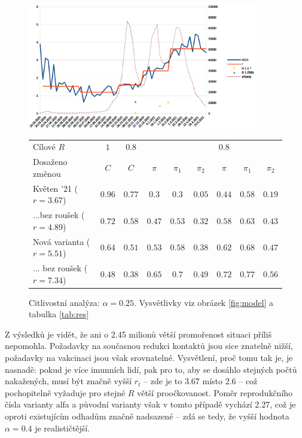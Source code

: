 \begin{figure}
\begin{center}
\includegraphics[width=10cm]{pic/whole4}
						 

\begin{tabular}{l|c|c|ccc|ccc}									
Cílové $R$	& $1$	& $0.8$	&	&	&	& $0.8$	&	&	\\ 
Dosaženo změnou	& $C$	& $C$	& $\pi$	& $\pi_1$	& $\pi_2$	& $\pi$	& $\pi_1$	& $\pi_2$	\\ \hline
Květen '21 ($r=3.67$)	& $0.96$	& $0.77$	& $0.3$	& $0.3$	& $0.05$	& $0.44$	& $0.58$	& $0.19$	\\
...bez roušek ($r=4.89$)	& $0.72$	& $0.58$	& $0.47$	& $0.53$	& $0.32$	& $0.58$	& $0.63$	& $0.43$	\\
Nová varianta ($r=5.51$)	& $0.64$	& $0.51$	& $0.53$	& $0.58$	& $0.38$	& $0.62$	& $0.68$	& $0.47$	\\
... bez roušek ($r=7.34$)	& $0.48$	& $0.38$	& $0.65$	& $0.7$	& $0.49$	& $0.72$	& $0.77$	& $0.56$	
\end{tabular}									


\caption{Citlivostní analýza: $\alpha=0.25$. Vysvětlivky viz obrázek \ref{fig:model} a tabulka \ref{tab:res}}
\label{fig:calpha}
\end{center}
\end{figure}
Z výsledků je vidět, že ani o 2.45 milionů větší promořenost situaci příliš
nepomohla. Požadavky na současnou redukci kontaktů jsou sice znatelně
nižší, požadavky na vakcinaci jsou však srovnatelné. Vysvětlení, proč
tomu tak je, je nasnadě: pokud je více imunních lidí, pak pro to,
aby se dosáhlo stejných počtů nakažených, musí být značně vyšší $r_{t}$
-- zde je to 3.67 místo 2.6 -- což pochopitelně vyžaduje pro stejné $R$
větší proočkovanost. Poměr reprodukčního čísla varianty alfa a
původní varianty však v tomto případě vychází 2.27, což je oproti
existujícím odhadům značně nadsazené -- zdá se tedy, že vyšší hodnota
$\alpha=0.4$ je realističtější.

